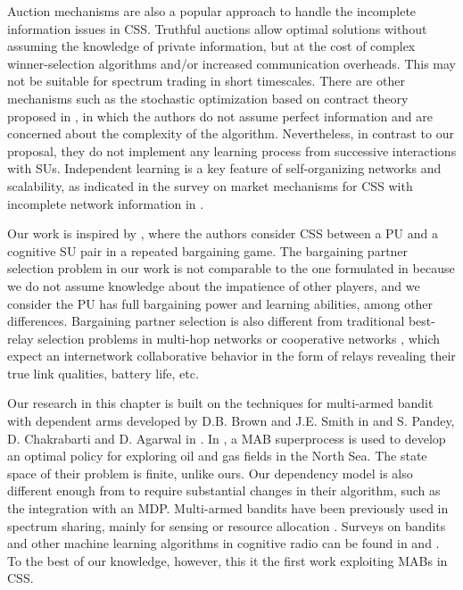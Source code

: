 Auction mechanisms are also a popular approach to handle the incomplete information issues in CSS.
Truthful auctions allow optimal solutions without assuming the knowledge of private information, but at the cost of complex winner-selection algorithms and/or increased communication overheads. This may not be suitable for spectrum trading in short timescales. There are other mechanisms such as the stochastic optimization based on contract theory proposed in \cite{ref:Duan2014}, in which the authors do not assume perfect information and are concerned about the complexity of the algorithm. Nevertheless, in contrast to our proposal, they do not implement any learning process from successive interactions with SUs. Independent learning is a key feature of self-organizing networks and scalability, as indicated in the survey on market mechanisms for CSS with incomplete network information in \cite{ref:Huang2013}.

Our work is inspired by \cite{ref:Yan2013}, where the authors consider CSS between a PU and a cognitive SU pair in a repeated bargaining game. 
The bargaining partner selection problem in our work is not comparable to the one formulated in \cite{ref:Calvo2002} because we do not assume knowledge about the impatience of other players, and we consider the PU has full bargaining power and learning abilities, among other differences. 
Bargaining partner selection is also different from traditional best-relay selection problems in multi-hop networks or cooperative networks \cite{ref:Yuan2013,ref:Tran2014}, which expect an internetwork collaborative behavior in the form of relays revealing their true link qualities, battery life, etc.

Our research in this chapter is built on the techniques for multi-armed bandit with dependent arms developed by D.B. Brown and J.E. Smith in \cite{ref:Brown2013} and S. Pandey, D. Chakrabarti and D. Agarwal in \cite{ref:Pandey2007}. In \cite{ref:Brown2013}, a MAB superprocess is used to develop an optimal policy for exploring oil and gas fields in the North Sea. The state space of their problem is finite, unlike ours. 
Our dependency model is also different enough from \cite{ref:Pandey2007} to require substantial changes in their algorithm, such as the integration with an MDP. 
Multi-armed bandits have been previously used in spectrum sharing, mainly for sensing or resource allocation \cite{ref:Si2010}. 
Surveys on bandits and other machine learning algorithms in cognitive radio can be found in \cite{ref:Bkassiny2013} and \cite{ref:Gavrilovska2013}.
To the best of our knowledge, however, this it the first work exploiting MABs in CSS. 


